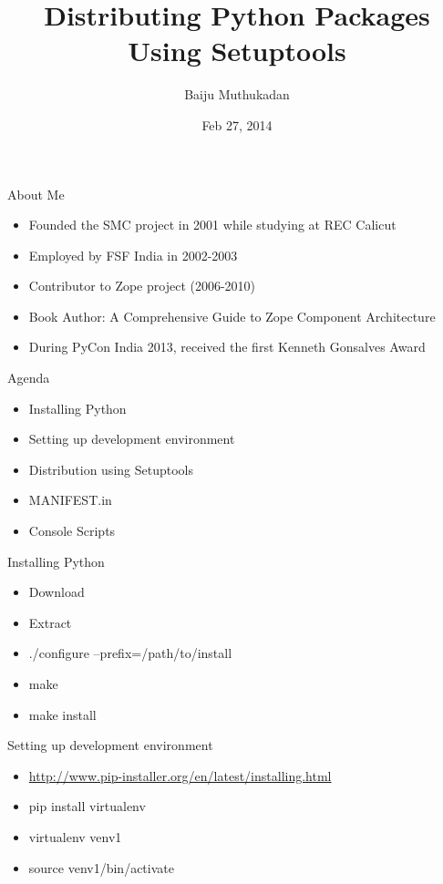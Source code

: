 \documentclass[12pt,handout]{beamer}
\title[Distributing Python Packages Using Setuptools]{Distributing Python Packages Using Setuptools}
\author{Baiju Muthukadan}
\institute{ZeOmega, Bangalore}
\date{Feb 27, 2014}
\begin{document}
\begin{frame}
\titlepage
\end{frame}

\begin{frame}{About Me}

\begin{itemize}
\item Founded the SMC project in 2001 while studying at REC Calicut
\item Employed by FSF India in 2002-2003
\item Contributor to Zope project (2006-2010)
\item Book Author: A Comprehensive Guide to Zope Component Architecture
\item During PyCon India 2013, received the first Kenneth Gonsalves Award
\end{itemize}

\end{frame}

\begin{frame}{Agenda}
\begin{itemize}
\item Installing Python
\item Setting up development environment
\item Distribution using Setuptools
\item MANIFEST.in
\item Console Scripts
\end{itemize}
\end{frame}

\begin{frame}{Installing Python}

\begin{itemize}

\item Download
\item Extract
\item ./configure --prefix=/path/to/install
\item make
\item make install

\end{itemize}
\end{frame}


\begin{frame}{Setting up development environment}

\begin{itemize}

\item \url{http://www.pip-installer.org/en/latest/installing.html}
\item pip install virtualenv
\item virtualenv venv1
\item source venv1/bin/activate

\end{itemize}
\end{frame}
\end{document}
